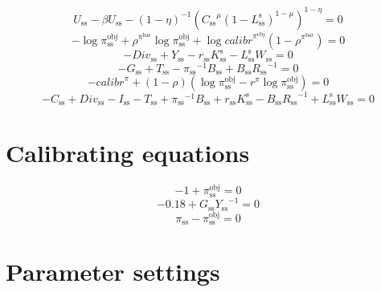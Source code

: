 \begin{equation}
U_\mathrm{ss} - {\beta} {U_\mathrm{ss}} - \left(1 - \eta\right)^{-1} {\left({{C_\mathrm{ss}}^{\mu}} {\left(1 - L^{\mathrm{s}}_\mathrm{ss}\right)^{1 - \mu}}\right)^{1 - \eta}} = 0
\end{equation}
\begin{equation}
-\log{\pi^{\mathrm{obj}}_\mathrm{ss}} + {\rho^{\pi^{\mathrm{bar}}}} {\log{\pi^{\mathrm{obj}}_\mathrm{ss}}} + {\log{{c\!a\!l\!i\!b\!r}^{\pi^{\mathrm{obj}}}}} \left(1 - \rho^{\pi^{\mathrm{bar}}}\right) = 0
\end{equation}
\begin{equation}
-{D\!i\!v}_\mathrm{ss} + Y_\mathrm{ss} - {r_\mathrm{ss}} {K^{\mathrm{s}}_\mathrm{ss}} - {L^{\mathrm{s}}_\mathrm{ss}} {W_\mathrm{ss}} = 0
\end{equation}
\begin{equation}
-G_\mathrm{ss} + T_\mathrm{ss} - {\pi_\mathrm{ss}}^{-1} {B_\mathrm{ss}} + {B_\mathrm{ss}} {R_\mathrm{ss}}^{-1} = 0
\end{equation}
\begin{equation}
-{c\!a\!l\!i\!b\!r}^{\pi} + \left(1 - \rho\right) \left(\log{\pi^{\mathrm{obj}}_\mathrm{ss}} - {r^{\pi}} {\log{\pi^{\mathrm{obj}}_\mathrm{ss}}}\right) = 0
\end{equation}
\begin{equation}
-C_\mathrm{ss} + {D\!i\!v}_\mathrm{ss} - I_\mathrm{ss} - T_\mathrm{ss} + {\pi_\mathrm{ss}}^{-1} {B_\mathrm{ss}} + {r_\mathrm{ss}} {K^{\mathrm{s}}_\mathrm{ss}} - {B_\mathrm{ss}} {R_\mathrm{ss}}^{-1} + {L^{\mathrm{s}}_\mathrm{ss}} {W_\mathrm{ss}} = 0
\end{equation}



\section{Calibrating equations}

\begin{equation}
-1 + \pi^{\mathrm{obj}}_\mathrm{ss} = 0
\end{equation}
\begin{equation}
-0.18 + {G_\mathrm{ss}} {Y_\mathrm{ss}}^{-1} = 0
\end{equation}
\begin{equation}
\pi_\mathrm{ss} - \pi^{\mathrm{obj}}_\mathrm{ss} = 0
\end{equation}



\section{Parameter settings}

